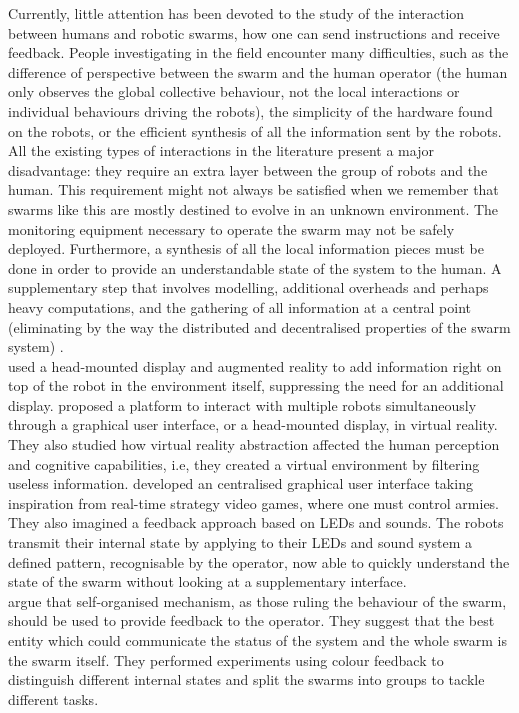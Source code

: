 \documentclass[oneside, a4paper, 12pt]{memoir}
\begin{document}
	Currently, little attention has been devoted to the study of the interaction between humans and robotic swarms, how one can send instructions and receive feedback. People investigating in the field encounter many difficulties, such as the difference of perspective between the swarm and the human operator (the human only observes the global collective behaviour, not the local interactions or individual behaviours driving the robots), the simplicity of the hardware found on the robots, or the efficient synthesis of all the information sent by the robots. All the existing types of interactions in the literature present a major disadvantage: they require an extra layer between the group of robots and the human. This requirement might not always be satisfied when we remember that swarms like this are mostly destined to evolve in an unknown environment. The monitoring equipment necessary to operate the swarm may not be safely deployed. Furthermore, a synthesis of all the local information pieces must be done in order to provide an understandable state of the system to the human. A supplementary step that involves modelling, additional overheads and perhaps heavy computations, and the gathering of all information at a central point (eliminating by the way the distributed and decentralised properties of the swarm system) \citep{podevijn2012self}.\\
	\citet{daily2003world} used a head-mounted display and augmented reality to add information right on top of the robot in the environment itself, suppressing the need for an additional display. \citet{baizid2009human} proposed a platform to interact with multiple robots simultaneously through a graphical user interface, or a head-mounted display, in virtual reality. They also studied how virtual reality abstraction affected the human perception and cognitive capabilities, i.e, they created a virtual environment by filtering useless information. \citet{mclurkin2006speaking} developed an centralised graphical user interface taking inspiration from real-time strategy video games, where one must control armies. They also imagined a feedback approach based on LEDs and sounds. The robots transmit their internal state by applying to their LEDs and sound system a defined pattern, recognisable by the operator, now able to quickly understand the state of the swarm without looking at a supplementary interface.\\
	\citet{podevijn2012self} argue that self-organised mechanism, as those ruling the behaviour of the swarm, should be used to provide feedback to the operator. They suggest that the best entity which could communicate the status of the system and the whole swarm is the swarm itself. They performed experiments using colour feedback to distinguish different internal states and split the swarms into groups to tackle different tasks.
	
\end{document}
